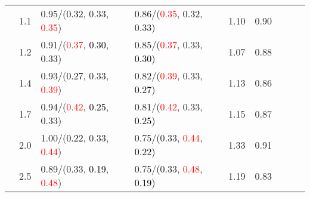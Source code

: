 \documentclass[10pt,a4paper]{report}
\begin{document}
\begin{table}[!htbp]
\begin{center}
{\begin{tabular}{ccllccccc}
				  & 1.1                               & 0.95/(\textcolor{black}{0.32}, 0.33, \textcolor{red}{0.35})                                                                                                                                   & 0.86/(\textcolor{red}{0.35}, \textcolor{black}{0.32}, 0.33)                                                                                                                                   & 1.10             & 0.90                     \\
				  & 1.2                               & 0.91/(\textcolor{red}{0.37}, \textcolor{black}{0.30}, 0.33)                                                                                                                                   & 0.85/(\textcolor{red}{0.37}, 0.33, \textcolor{black}{0.30})                                                                                                                                   & 1.07             & 0.88                     \\
				  & 1.4                               & 0.93/(\textcolor{black}{0.27}, 0.33, \textcolor{red}{0.39})                                                                                                                                   & 0.82/(\textcolor{red}{0.39}, 0.33, \textcolor{black}{0.27})                                                                                                                                   & 1.13             & 0.86                     \\
				  & 1.7                               & 0.94/(\textcolor{red}{0.42}, \textcolor{black}{0.25}, 0.33)                                                                                                                                   & 0.81/(\textcolor{red}{0.42}, 0.33, \textcolor{black}{0.25})                                                                                                                                   & 1.15             & 0.87                     \\
				  & 2.0                               & 1.00/(\textcolor{black}{0.22}, 0.33, \textcolor{red}{0.44})                                                                                                                                   & 0.75/(0.33, \textcolor{red}{0.44}, \textcolor{black}{0.22})                                                                                                                                   & 1.33             & 0.91                     \\
				  & 2.5                               & 0.89/(0.33, \textcolor{black}{0.19}, \textcolor{red}{0.48})                                                                                                                                   & 0.75/(0.33, \textcolor{red}{0.48}, \textcolor{black}{0.19})                                                                                                                                   & 1.19             & 0.83                     \\

\end{tabular}}
\end{center}
\end{table}
\end{document}
